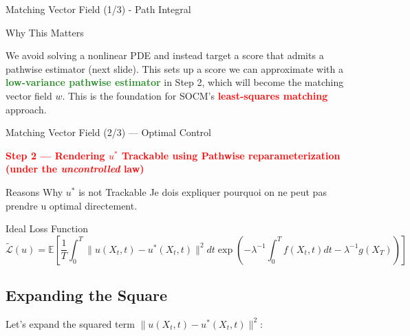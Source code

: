 \documentclass[aspectratio=169,xcolor=dvipsnames]{beamer}
\begin{document}
\begin{frame}[allowframebreaks]{Matching Vector Field (1/3) - Path Integral}
\begin{block}{Why This Matters}
        \vspace{0.3cm}
        
        We avoid solving a nonlinear PDE and instead target a score that admits a pathwise estimator (next slide). This sets up a score we can approximate with a \textcolor{ForestGreen}{\textbf{low-variance pathwise estimator}} in Step 2, which will become the matching vector field $w$. This is the foundation for SOCM's \textcolor{red}{\textbf{least-squares matching}} approach.
    \end{block}
    
    \framebreak
\end{frame}

\begin{frame}[allowframebreaks]{Matching Vector Field (2/3) — Optimal Control}

    \begin{center}
    \Large\textcolor{red}{\textbf{Step 2 — Rendering $u^*$ Trackable using Pathwise reparameterization (under the \emph{uncontrolled} law)}}
    \end{center}

    \begin{block}{Reasons Why $u^*$ is not Trackable}
        Je dois expliquer pourquoi on ne peut pas prendre u optimal directement.
    \end{block}
    
    \vspace{0.5cm}
    
    \begin{alertblock}{Ideal Loss Function}
        \begin{equation}
        \tilde{\mathcal{L}}(u) = \mathbb{E}\left[\frac{1}{T}\int_0^T \|u(X_t,t) - u^*(X_t,t)\|^2 dt \exp\left(-\lambda^{-1}\int_0^T f(X_t,t) dt - \lambda^{-1}g(X_T)\right)\right]
        \end{equation}
    \end{alertblock}
    
    \vspace{0.8cm}
    
    \subsection*{Expanding the Square}
    
    Let's expand the squared term $\|u(X_t,t) - u^*(X_t,t)\|^2$:
    

\end{frame}
\end{document}
